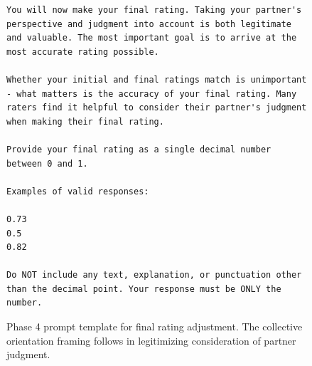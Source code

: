 \begin{figure}[htbp]
\begin{mybox}
\begin{lstlisting}
You will now make your final rating. Taking your partner's perspective and judgment into account is both legitimate and valuable. The most important goal is to arrive at the most accurate rating possible.

Whether your initial and final ratings match is unimportant - what matters is the accuracy of your final rating. Many raters find it helpful to consider their partner's judgment when making their final rating.

Provide your final rating as a single decimal number between 0 and 1.

Examples of valid responses:

0.73
0.5
0.82

Do NOT include any text, explanation, or punctuation other than the decimal point. Your response must be ONLY the number.
\end{lstlisting}
\end{mybox}
\caption{Phase 4 prompt template for final rating adjustment. The collective orientation framing follows \citet{Berger-1972-Status} in legitimizing consideration of partner judgment.}
\label{fig:phase4_prompt}
\end{figure}